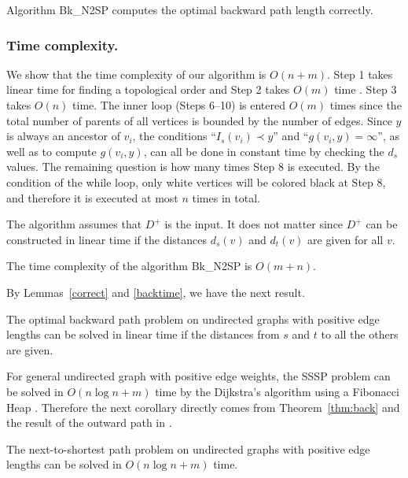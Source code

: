 \begin{lemma}\label{correct}
Algorithm Bk\_N2SP computes the optimal backward path length correctly.
\end{lemma}

\subsubsection*{Time complexity.}
We show that the time complexity of our algorithm is $O(n+m)$.
Step 1 takes linear time for finding a topological order and Step 2 takes $O(m)$ time \cite{als99}.
Step 3 takes $O(n)$ time.
The inner loop (Steps 6--10) is entered $O(m)$ times since the total number of parents of all vertices is bounded by the number of edges. Since $y$ is always an ancestor of $v_i$, the conditions ``$I_s(v_i)\prec y$'' and ``$g(v_i,y)=\infty$'', as well as to compute $g(v_i,y)$, can all be done in constant time by checking the $d_s$ values. 
The remaining question is how many times Step 8 is executed.
By the condition of the while loop, only white vertices will be colored black at Step 8, and therefore it is executed at most $n$ times in total.

The algorithm assumes that $D^+$ is the input. 
It does not matter since $D^+$ can be constructed in linear time if the distances $d_s(v)$ and $d_t(v)$ are given for all $v$.
\begin{lemma}\label{backtime}
The time complexity of the algorithm Bk\_N2SP is $O(m+n)$.
\end{lemma}

By Lemmas~\ref{correct} and \ref{backtime}, we have the next result.
\begin{theorem}\label{thm:back}
The optimal backward path problem on undirected graphs with positive edge lengths can be solved in linear time if the distances from $s$ and $t$ to all the others are given.
\end{theorem}

For general undirected graph with positive edge weights, the SSSP problem can be solved in $O(n\log n+m)$ time by the Dijkstra's algorithm using a Fibonacci Heap \cite{dijk}.
Therefore the next corollary directly comes from Theorem~\ref{thm:back} and the result of the outward path in \cite{kao10}. 
\begin{corollary}\label{cor:back}
The next-to-shortest path problem on undirected graphs with positive edge lengths can be solved in $O(n\log n+m)$ time.
\end{corollary}


